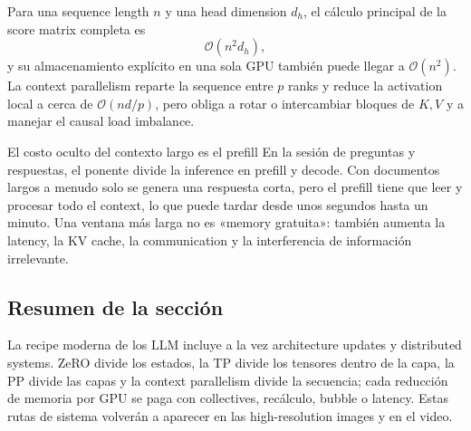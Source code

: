 Para una sequence length $n$ y una head dimension $d_h$, el cálculo principal de la score matrix completa es
\[
\mathcal{O}(n^2d_h),
\]
y su almacenamiento explícito en una sola GPU también puede llegar a $\mathcal{O}(n^2)$. La context parallelism reparte la sequence entre $p$ ranks y reduce la activation local a cerca de $\mathcal{O}(nd/p)$, pero obliga a rotar o intercambiar bloques de $K,V$ y a manejar el causal load imbalance.

\begin{warningbox}{El costo oculto del contexto largo es el prefill}
En la sesión de preguntas y respuestas, el ponente divide la inference en prefill y decode. Con documentos largos a menudo solo se genera una respuesta corta, pero el prefill tiene que leer y procesar todo el context, lo que puede tardar desde unos segundos hasta un minuto. Una ventana más larga no es «memory gratuita»: también aumenta la latency, la KV cache, la communication y la interferencia de información irrelevante.
\end{warningbox}


\subsection{Resumen de la sección}

La recipe moderna de los LLM incluye a la vez architecture updates y distributed systems. ZeRO divide los estados, la TP divide los tensores dentro de la capa, la PP divide las capas y la context parallelism divide la secuencia; cada reducción de memoria por GPU se paga con collectives, recálculo, bubble o latency. Estas rutas de sistema volverán a aparecer en las high-resolution images y en el video.
